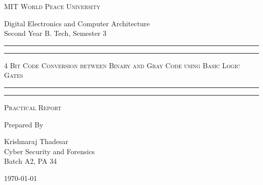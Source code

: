 \documentclass[11pt]{article}
\begin{document}
	
	\begin{titlepage} 
		\centering 
		
		
		\huge\textsc{
			MIT World Peace University
		}\\
	
		\vspace{0.75\baselineskip} %
		
		\LARGE{
			Digital Electronics and Computer Architecture\\
			Second Year B. Tech, Semester 3
		}
		
		\vfill %
		
		
		\rule{\textwidth}{1.6pt}\vspace*{-\baselineskip}\vspace*{2pt}
		\rule{\textwidth}{0.6pt}
		\vspace{0.75\baselineskip} %
		
		
		
		\huge{\textsc{
			4 Bit Code Conversion between Binary and Gray Code using Basic Logic Gates
		}} \\
		
		
		
		\vspace{0.5\baselineskip} %
		\rule{\textwidth}{0.6pt}\vspace*{-\baselineskip}\vspace*{2.8pt}
		\rule{\textwidth}{1.6pt}
		
		\vspace{1\baselineskip} %

			
		\LARGE\textsc{
			Practical Report
		} %
		\vfill
		
		
		Prepared By
		\vspace{0.5\baselineskip} %
		
		\Large{
			Krishnaraj Thadesar \\
			Cyber Security and Forensics\\
			Batch A2, PA 34
		}
		
		
		\vspace{0.5\baselineskip} %
		\today

	\end{titlepage}
	
\end{document}

